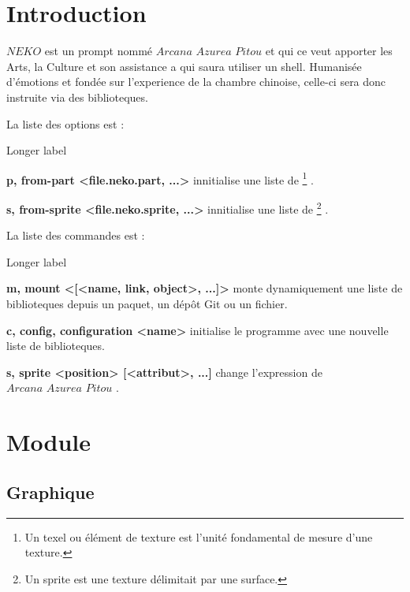 \documentclass{report}
\newcommand{\name}{\textit{Arcana Azurea Pitou}}
\newcommand{\program}{\textit{NEKO}}
\begin{document}
\section{Introduction}
\thispagestyle{empty}
$\program$ est un prompt nommé $\name$ et qui ce veut apporter les Arts, la Culture et son assistance a qui saura utiliser un shell.
Humanisée d’émotions et fondée sur l'experience de la chambre chinoise, celle-ci sera donc instruite via des biblioteques.

La liste des options est :
\begin{labeling}{Longer label\quad}
	\item[\textbf{
		\textendash p,
		\textendash\textendash from-part <file.neko.part, ...>}] innitialise une liste de 
				\footnote{ Un texel ou élément de texture est l'unité fondamental de mesure d'une texture. }
					\textendash { }.
	\item[\textbf{
		\textendash s,
		\textendash\textendash from-sprite <file.neko.sprite, ...>}] innitialise une liste de
				\footnote{ Un sprite est une texture délimitait par une surface. }
					\textendash { }.
\end{labeling}

La liste des commandes est :

\begin{labeling}{Longer label\quad}
	\item[\textbf{
		\textendash m,
		\textendash\textendash mount <[<name, link, object>, ...]>
	}] monte dynamiquement une liste de biblioteques depuis un paquet, un dépôt Git ou un fichier.
	\item[\textbf{
		\textendash c,
		\textendash\textendash config,
		\textendash\textendash configuration <name>
	}] initialise le programme avec une nouvelle liste de biblioteques.
	\item[\textbf{
		\textendash s,
		\textendash\textendash sprite <position> [<attribut>, ...]
	}] change l'expression de $\name$ .
\end{labeling}

\newpage

\section{Module}



\subsection{Graphique}
\end{document}
